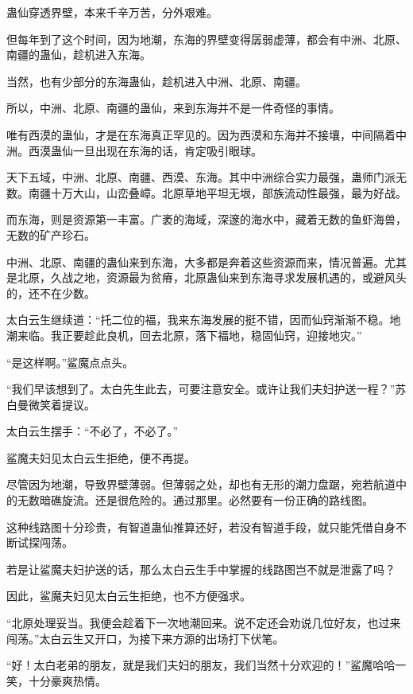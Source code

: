 
\begin{this_body}



蛊仙穿透界壁，本来千辛万苦，分外艰难。

但每年到了这个时间，因为地潮，东海的界壁变得孱弱虚薄，都会有中洲、北原、南疆的蛊仙，趁机进入东海。

当然，也有少部分的东海蛊仙，趁机进入中洲、北原、南疆。

所以，中洲、北原、南疆的蛊仙，来到东海并不是一件奇怪的事情。

唯有西漠的蛊仙，才是在东海真正罕见的。因为西漠和东海并不接壤，中间隔着中洲。西漠蛊仙一旦出现在东海的话，肯定吸引眼球。

天下五域，中洲、北原、南疆、西漠、东海。其中中洲综合实力最强，蛊师门派无数。南疆十万大山，山峦叠嶂。北原草地平坦无垠，部族流动性最强，最为好战。

而东海，则是资源第一丰富。广袤的海域，深邃的海水中，藏着无数的鱼虾海兽，无数的矿产珍石。

中洲、北原、南疆的蛊仙来到东海，大多都是奔着这些资源而来，情况普遍。尤其是北原，久战之地，资源最为贫瘠，北原蛊仙来到东海寻求发展机遇的，或避风头的，还不在少数。

太白云生继续道：“托二位的福，我来东海发展的挺不错，因而仙窍渐渐不稳。地潮来临。我正要趁此良机，回去北原，落下福地，稳固仙窍，迎接地灾。”

“是这样啊。”鲨魔点点头。

“我们早该想到了。太白先生此去，可要注意安全。或许让我们夫妇护送一程？”苏白曼微笑着提议。

太白云生摆手：“不必了，不必了。”

鲨魔夫妇见太白云生拒绝，便不再提。

尽管因为地潮，导致界壁薄弱。但薄弱之处，却也有无形的潮力盘踞，宛若航道中的无数暗礁旋流。还是很危险的。通过那里。必然要有一份正确的路线图。

这种线路图十分珍贵，有智道蛊仙推算还好，若没有智道手段，就只能凭借自身不断试探闯荡。

若是让鲨魔夫妇护送的话，那么太白云生手中掌握的线路图岂不就是泄露了吗？

因此，鲨魔夫妇见太白云生拒绝，也不方便强求。

“北原处理妥当。我便会趁着下一次地潮回来。说不定还会劝说几位好友，也过来闯荡。”太白云生又开口，为接下来方源的出场打下伏笔。

“好！太白老弟的朋友，就是我们夫妇的朋友，我们当然十分欢迎的！”鲨魔哈哈一笑，十分豪爽热情。


\end{this_body}
